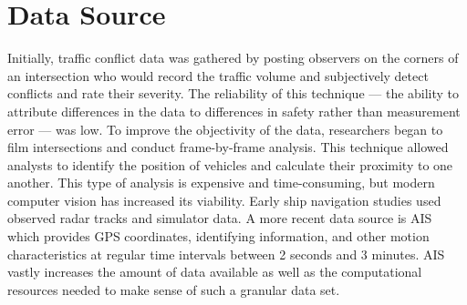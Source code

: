 \documentclass[twoside,symmetric,notoc]{tufte-book}
\begin{document}
\section{Data Source}
\par{%
Initially, traffic conflict data was gathered by posting observers on the corners of an intersection who would record the traffic volume and subjectively detect conflicts and rate their severity. The reliability of this technique --- the ability to attribute differences in the data to differences in safety rather than measurement error --- was low. To improve the objectivity of the data, researchers began to film intersections and conduct frame-by-frame analysis. This technique allowed analysts to identify the position of vehicles and calculate their proximity to one another. This type of analysis is expensive and time-consuming, but modern computer vision has increased its viability. Early ship navigation studies used observed radar tracks and simulator data. A more recent data source is AIS which provides GPS coordinates, identifying information, and other motion characteristics at regular time intervals between 2 seconds and 3 minutes. AIS vastly increases the amount of data available as well as the computational resources needed to make sense of such a granular data set.
}
\end{document}
